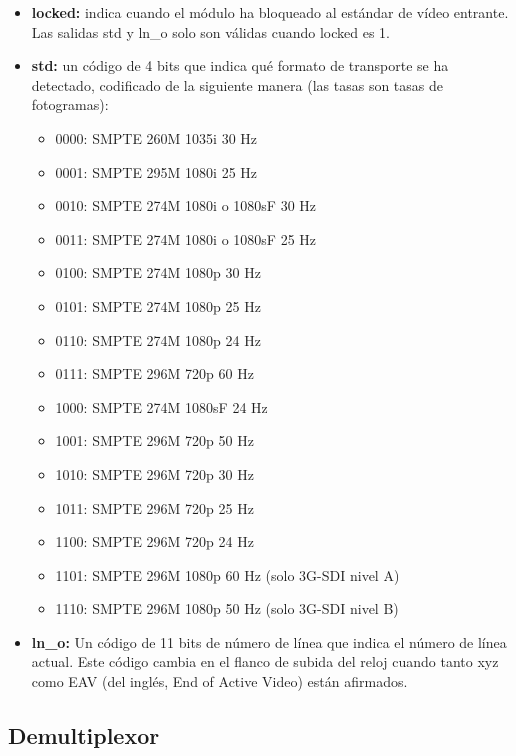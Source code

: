 \begin{itemize}
    \item \textbf{locked:} indica cuando el módulo ha bloqueado al estándar de
    vídeo entrante. Las salidas std y ln\_o solo son válidas cuando locked es 1. \\
    \item \textbf{std:} un código de 4 bits que indica qué formato de transporte
    se ha detectado, codificado de la siguiente manera (las tasas son tasas de
    fotogramas): \\
    \begin{itemize}
        \item 0000: SMPTE 260M 1035i           30 Hz
        \item 0001: SMPTE 295M 1080i           25 Hz
        \item 0010: SMPTE 274M 1080i o 1080sF  30 Hz
        \item 0011: SMPTE 274M 1080i o 1080sF  25 Hz
        \item 0100: SMPTE 274M 1080p           30 Hz   
        \item 0101: SMPTE 274M 1080p           25 Hz   
        \item 0110: SMPTE 274M 1080p           24 Hz
        \item 0111: SMPTE 296M 720p            60 Hz
        \item 1000: SMPTE 274M 1080sF          24 Hz
        \item 1001: SMPTE 296M 720p            50 Hz
        \item 1010: SMPTE 296M 720p            30 Hz
        \item 1011: SMPTE 296M 720p            25 Hz
        \item 1100: SMPTE 296M 720p            24 Hz
        \item 1101: SMPTE 296M 1080p           60 Hz    (solo 3G-SDI nivel A)
        \item 1110: SMPTE 296M 1080p           50 Hz    (solo 3G-SDI nivel B)
    \end{itemize}
    \item \textbf{ln\_o:} Un código de 11 bits de número de línea que indica el
    número de línea actual. Este código cambia en el flanco de subida del reloj
    cuando tanto xyz como EAV  (del inglés, End of Active Video) están afirmados.
\end{itemize}

\subsection{Demultiplexor}


